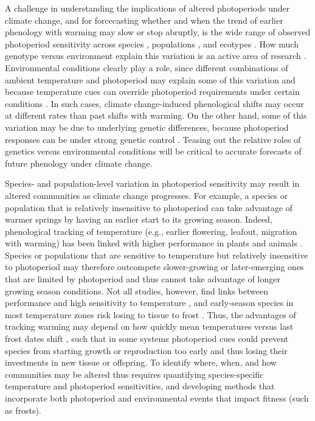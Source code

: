 \documentclass{article}
\begin{document}
 \par A challenge in understanding the implications of altered photoperiods under climate change, and for forcecasting whether and when the trend of earlier phenology with warming may slow or stop abruptly, is the wide range of observed photoperiod sensitivity across species \citep{flynn2018,Sanz-Perez:2009aa, zohner2016}, populations \citep{tanino2010}, and ecotypes \citep{Howe:1995aa}. How much genotype versus environment explain this variation is an active area of research \citep[e.g.,][]{franks2014,gould2010,mimura2010,frejaville2019}. Environmental conditions clearly play a role, since different combinations of ambient temperature and photoperiod may explain some of this variation and because temperature cues can override photoperiod requirements under certain conditions \citep [e.g.,][] {tanino2010}. In such cases, climate change-induced phenological shifts may occur at different rates than past shifts with warming. On the other hand, some of this variation may be due to underlying genetic differences, because photoperiod responses can be under strong genetic control \citep[][see also Boxes 1, 2]{bradshaw1995,keller2011,weih2004}. Teasing out the relative roles of genetics versus environmental conditions will be critical to accurate forecasts of future phenology under climate change.

\par Species- and population-level variation in photoperiod sensitivity may result in altered communities as climate change progresses. For example, a species or population that is relatively insensitive to photoperiod can take advantage of warmer springs by having an earlier start to its growing season. Indeed, phenological tracking of temperature (e.g., earlier flowering, leafout, migration with warming) has been linked with higher performance in plants and animals \citep{cleland2012,muir1994,willis2010}. Species or populations that are sensitive to temperature but relatively insensitive to photoperiod may therefore outcompete slower-growing or later-emerging ones that are limited by photoperiod and thus cannot take advantage of longer growing season conditions. Not all studies, however, find links between performance and high sensitivity to temperature \citep[e.g.,][]{block2019}, and early-season species in most temperature zones risk losing to tissue to frost \citep{frostbook}. Thus, the advantages of tracking warming may depend on how quickly mean temperatures versus last frost dates shift \citep[e.g.,][]{inouye2002}, such that in some systems photoperiod cues could prevent species from starting growth or reproduction too early and thus losing their investments in new tissue or offspring. To identify where, when, and how communities may be altered thus requires quantifying species-specific temperature and photoperiod sensitivities, and developing methods that incorporate both photoperiod and environmental events that impact fitness (such as frosts).
\end{document}
